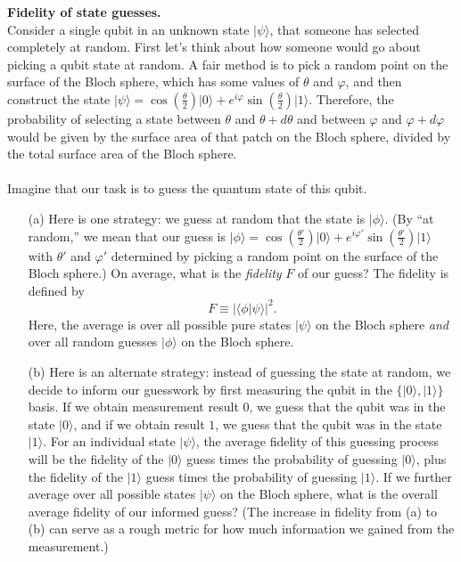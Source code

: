 \documentclass[12pt,letterpaper,boxed,cm]{hmcpset}
\newcommand{\abs}[1]{\left| #1 \right|}
\newcommand{\ket}[1]{\big\lvert #1\big\rangle}
\newcommand{\braket}[2]{\big\langle #1\big\vert #2\big\rangle}
\begin{document}
\begin{problem}[3] 
    \textbf{Fidelity of state guesses.}\\
    Consider a single qubit in an unknown state $\ket{\psi}$, that someone has selected completely at random. First let's think about how someone would go about picking a qubit state at random. A fair method is to pick a random point on the surface of the Bloch sphere, which has some values of $\theta$ and $\varphi$, and then construct the state $\ket{\psi}=\cos(\frac{\theta}{2})\ket{0} + e^{i\varphi}\sin(\frac{\theta}{2})\ket{1}$. Therefore, the probability of selecting a state between $\theta$ and $\theta+d\theta$ and between $\varphi$ and $\varphi+d\varphi$ would be given by the surface area of that patch on the Bloch sphere, divided by the total surface area of the Bloch sphere.  
    \\
    \\
    Imagine that our task is to guess the quantum state of this qubit.
    \begin{enumerate}
        \item [(a)] Here is one strategy:  we guess at random that the state is $\ket{\phi}$.  (By ``at random,'' we mean that our guess is $\ket{\phi} = \cos(\frac{\theta'}{2})\ket{0} + e^{i\varphi'}\sin(\frac{\theta'}{2})\ket{1}$ with $\theta'$ and $\varphi'$ determined by picking a random point on the surface of the Bloch sphere.)  On average, what is the \textit{fidelity} $F$ of our guess?  The fidelity is defined by
        \[
            F \equiv \abs{\braket{\phi}{\psi}}^2.
        \]
        Here, the average is over all possible pure states $\ket{\psi}$ on the Bloch sphere \textit{and} over all random guesses $\ket{\phi}$ on the Bloch sphere.
        \item [(b)] Here is an alternate strategy:  instead of guessing the state at random, we decide to inform our guesswork by first measuring the qubit in the $\{\ket{0},\ket{1}\}$ basis.  If we obtain measurement result $0$, we guess that the qubit was in the state $\ket{0}$, and if we obtain result $1$, we guess that the qubit was in the state $\ket{1}$.  For an individual state $\ket{\psi}$, the average fidelity of this guessing process will be the fidelity of the $\ket{0}$ guess times the probability of guessing $\ket{0}$, plus the fidelity of the $\ket{1}$ guess times the probability of guessing $\ket{1}$.  If we further average over all possible states $\ket{\psi}$ on the Bloch sphere, what is the overall average fidelity of our informed guess?
    (The increase in fidelity from (a) to (b) can serve as a rough metric for how much information we gained from the measurement.)
    \end{enumerate}
\end{problem}
\end{document}
